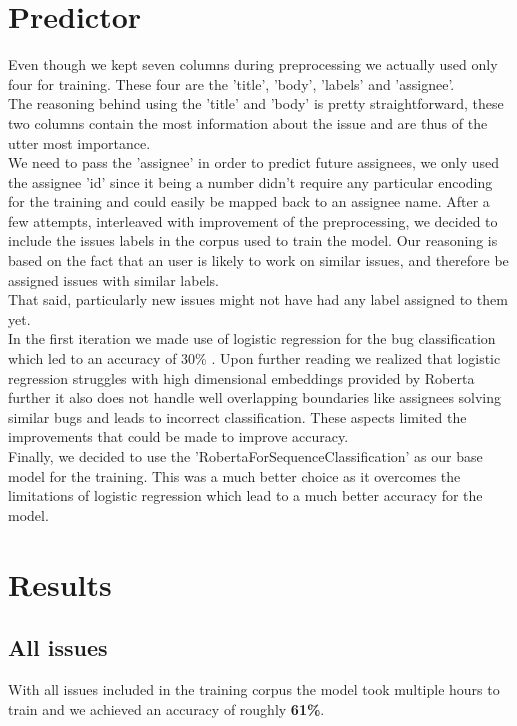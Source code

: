 \documentclass[tikz,10pt,fleqn]{article}
\begin{document}
\section*{Predictor}
Even though we kept seven columns during preprocessing we actually used only four for training. These four are the 'title', 'body', 'labels' and 'assignee'.\\
The reasoning behind using the 'title' and 'body' is pretty straightforward, these two columns contain the most information about the issue and are thus of the utter most importance. \\
We need to pass the 'assignee' in order to predict future assignees, we only used the assignee 'id' since it being a number didn't require any particular encoding for the training and could easily be mapped back to an assignee name.\newpage
After a few attempts, interleaved with improvement of the preprocessing, we decided to include the issues labels in the corpus used to train the model. Our reasoning is based on the fact that an user is likely to work on similar issues, and therefore be assigned issues with similar labels.\\
That said, particularly new issues might not have had any label assigned to them yet.\\
In the first iteration we made use of logistic regression for the bug classification which led to an accuracy of 30\% . Upon further reading we realized that logistic regression struggles with high dimensional embeddings provided by Roberta further it also does not handle well overlapping boundaries like assignees solving similar bugs and leads to incorrect classification. These aspects limited the improvements that could be made to improve accuracy.\\
Finally, we decided to use the 'RobertaForSequenceClassification' as our base model for the training. This was a much better choice as it overcomes the limitations of logistic regression which lead to a much better accuracy for the model.


\section*{Results}
\subsection*{All issues}
With all issues included in the training corpus the model took multiple hours to train and we achieved an accuracy of roughly \textbf{61\%}.
\end{document}
